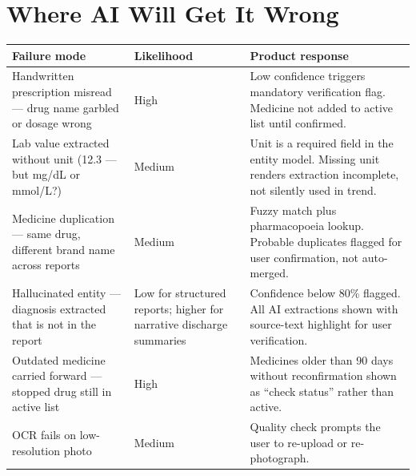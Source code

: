 \documentclass[11pt, a4paper]{article}
\begin{document}
\section{Where AI Will Get It Wrong}


\begin{tabularx}{\linewidth}{@{}L{4.4cm} L{2.4cm} X@{}}
\toprule
\textbf{Failure mode} & \textbf{Likelihood} & \textbf{Product response} \\
\midrule
Handwritten prescription misread --- drug name garbled or dosage wrong &
High &
Low confidence triggers mandatory verification flag. Medicine not added to active list until confirmed. \\
\addlinespace
Lab value extracted without unit (12.3 --- but mg/dL or mmol/L?) &
Medium &
Unit is a required field in the entity model. Missing unit renders extraction incomplete, not silently used in trend. \\
\addlinespace
Medicine duplication --- same drug, different brand name across reports &
Medium &
Fuzzy match plus pharmacopoeia lookup. Probable duplicates flagged for user confirmation, not auto-merged. \\
\addlinespace
Hallucinated entity --- diagnosis extracted that is not in the report &
Low for structured reports; higher for narrative discharge summaries &
Confidence below 80\% flagged. All AI extractions shown with source-text highlight for user verification. \\
\addlinespace
Outdated medicine carried forward --- stopped drug still in active list &
High &
Medicines older than 90 days without reconfirmation shown as ``check status'' rather than active. \\
\addlinespace
OCR fails on low-resolution photo &
Medium &
Quality check prompts the user to re-upload or re-photograph. \\
\bottomrule
\end{tabularx}

\end{document}
